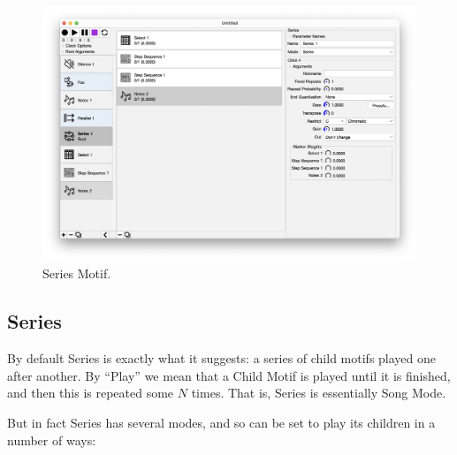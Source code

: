\documentclass[twoside,10pt]{article}
\begin{document}
\begin{figure}[t]
\centering
\includegraphics[width=6.5in]{Series}
\vspace{-2em}
\caption{Series Motif.}
\label{series}
\end{figure}

\subsection{Series}

By default Series is exactly what it suggests: a series of child motifs played one after another.   By ``Play'' we mean that a Child Motif is played until it is finished, and then this is repeated some \(N\) times.  That is, Series is essentially Song Mode.  

But in fact Series has several modes, and so can be set to play its children in a number of ways:
\end{document}
